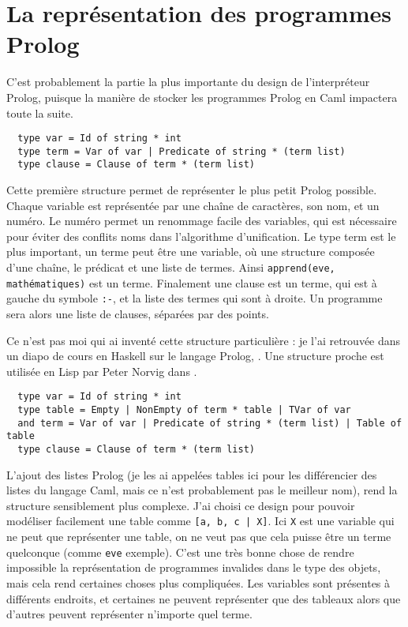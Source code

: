 \documentclass{article}
\begin{document}
\section{La représentation des programmes Prolog}

C'est probablement la partie la plus importante du design de l'interpréteur Prolog, puisque la manière de stocker les programmes Prolog en Caml impactera toute la suite.

\begin{verbatim}
  type var = Id of string * int
  type term = Var of var | Predicate of string * (term list)
  type clause = Clause of term * (term list)
\end{verbatim}

Cette première structure permet de représenter le plus petit Prolog possible. Chaque variable est représentée par une chaîne de caractères, son nom, et un numéro. Le numéro permet un renommage facile des variables, qui est nécessaire pour éviter des conflits noms dans l'algorithme d'unification. Le type term est le plus important, un terme peut être une variable, où une structure composée d'une chaîne, le prédicat et une liste de termes. Ainsi \texttt{apprend(eve, mathématiques)} est un terme. Finalement une clause est un terme, qui est à gauche du symbole \texttt{:-}, et la liste des termes qui sont à droite. Un programme sera alors une liste de clauses, séparées par des points.

Ce n'est pas moi qui ai inventé cette structure particulière : je l'ai retrouvée dans un diapo de cours en Haskell sur le langage Prolog, \cite{Smaill}. Une structure proche est utilisée en Lisp par Peter Norvig dans \cite{Norvig}.

\begin{verbatim}
  type var = Id of string * int
  type table = Empty | NonEmpty of term * table | TVar of var
  and term = Var of var | Predicate of string * (term list) | Table of table
  type clause = Clause of term * (term list)
\end{verbatim}

L'ajout des listes Prolog (je les ai appelées tables ici pour les différencier des listes du langage Caml, mais ce n'est probablement pas le meilleur nom), rend la structure sensiblement plus complexe. J'ai choisi ce design pour pouvoir modéliser facilement une table comme \texttt{[a, b, c | X]}. Ici \texttt{X} est une variable qui ne peut que représenter une table, on ne veut pas que cela puisse être un terme quelconque (comme \texttt{eve} exemple). C'est une très bonne chose de rendre impossible la représentation de programmes invalides dans le type des objets, mais cela rend certaines choses plus compliquées. Les variables sont présentes à différents endroits, et certaines ne peuvent représenter que des tableaux alors que d'autres peuvent représenter n'importe quel terme.
\end{document}
